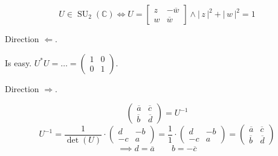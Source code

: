 \documentclass[a4paper]{article}
\theoremstyle{definition}
\newcommand\card[1]{\left|\,#1\,\right|}
\begin{document}
\[ U \in \operatorname{SU}_2(\mathbb C) \iff U = \begin{bmatrix} z & -\overline{w} \\ w & \overline{w} \end{bmatrix} \land \card{z}^2 + \card{w}^2 = 1 \]

Direction $\Leftarrow$.

Is easy. $U^* U = \dots = \begin{pmatrix} 1 & 0 \\ 0 & 1 \end{pmatrix}$.

Direction $\Rightarrow$.

\[
  \begin{pmatrix}
    \overline a & \overline c \\
    \overline b & \overline d
  \end{pmatrix} = U^{-1}
\] \[
  U^{-1} = \frac{1}{\det(U)} \cdot \begin{pmatrix} d & -b \\ -c & a \end{pmatrix}
  = \frac11 \cdot \begin{pmatrix} d & -b  \\ -c & a \end{pmatrix} = \begin{pmatrix} \overline a & \overline c \\ \overline b & \overline d \end{pmatrix}
\] \[
  \implies d = \overline a \qquad b = -\overline c
\]
\end{document}
